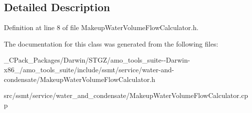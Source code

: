 \subsection{Detailed Description}


Definition at line 8 of file Makeup\+Water\+Volume\+Flow\+Calculator.\+h.



The documentation for this class was generated from the following files\+:\begin{DoxyCompactItemize}
\item 
\+\_\+\+C\+Pack\+\_\+\+Packages/\+Darwin/\+S\+T\+G\+Z/amo\+\_\+tools\+\_\+suite-\/-\/\+Darwin-\/x86\+\_/amo\+\_\+tools\+\_\+suite/include/ssmt/service/water-\/and-\/condensate/Makeup\+Water\+Volume\+Flow\+Calculator.\+h\item 
src/ssmt/service/water\+\_\+and\+\_\+condensate/Makeup\+Water\+Volume\+Flow\+Calculator.\+cpp\end{DoxyCompactItemize}
